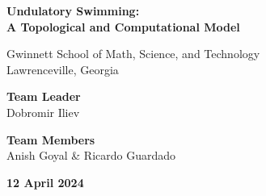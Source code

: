 \documentclass{article}
\renewcommand{\title}{Undulatory Swimming:\\ A Topological and Computational Model}
\begin{document}
\begin{titlepage}
  \centering
  \vspace*{1in}
  {\fontsize{56pt}{2\baselineskip}\selectfont \bfseries
  \title}
  \vfill

  \Large
  Gwinnett School of Math, Science, and Technology\\
  Lawrenceville, Georgia

  \vspace{0.5in}
  \selectfont

  \vspace{1em}
  \textbf{Team Leader}\\ Dobromir Iliev

  \vspace{1em}
  \textbf{Team Members}\\ Anish Goyal \& Ricardo Guardado

  \vspace{1em}
  \textbf{12 April 2024}
\end{titlepage}
\tableofcontents
\newpage
\end{document}
